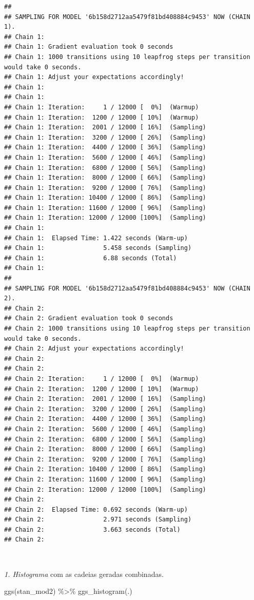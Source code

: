 \documentclass[
]{book}
\newenvironment{Shaded}{\begin{snugshade}}{\end{snugshade}}
\newcommand{\FunctionTok}[1]{\textcolor[rgb]{0.00,0.00,0.00}{#1}}
\newcommand{\NormalTok}[1]{#1}
\newcommand{\SpecialCharTok}[1]{\textcolor[rgb]{0.00,0.00,0.00}{#1}}
\begin{document}
\begin{verbatim}
## 
## SAMPLING FOR MODEL '6b158d2712aa5479f81bd408884c9453' NOW (CHAIN 1).
## Chain 1: 
## Chain 1: Gradient evaluation took 0 seconds
## Chain 1: 1000 transitions using 10 leapfrog steps per transition would take 0 seconds.
## Chain 1: Adjust your expectations accordingly!
## Chain 1: 
## Chain 1: 
## Chain 1: Iteration:     1 / 12000 [  0%]  (Warmup)
## Chain 1: Iteration:  1200 / 12000 [ 10%]  (Warmup)
## Chain 1: Iteration:  2001 / 12000 [ 16%]  (Sampling)
## Chain 1: Iteration:  3200 / 12000 [ 26%]  (Sampling)
## Chain 1: Iteration:  4400 / 12000 [ 36%]  (Sampling)
## Chain 1: Iteration:  5600 / 12000 [ 46%]  (Sampling)
## Chain 1: Iteration:  6800 / 12000 [ 56%]  (Sampling)
## Chain 1: Iteration:  8000 / 12000 [ 66%]  (Sampling)
## Chain 1: Iteration:  9200 / 12000 [ 76%]  (Sampling)
## Chain 1: Iteration: 10400 / 12000 [ 86%]  (Sampling)
## Chain 1: Iteration: 11600 / 12000 [ 96%]  (Sampling)
## Chain 1: Iteration: 12000 / 12000 [100%]  (Sampling)
## Chain 1: 
## Chain 1:  Elapsed Time: 1.422 seconds (Warm-up)
## Chain 1:                5.458 seconds (Sampling)
## Chain 1:                6.88 seconds (Total)
## Chain 1: 
## 
## SAMPLING FOR MODEL '6b158d2712aa5479f81bd408884c9453' NOW (CHAIN 2).
## Chain 2: 
## Chain 2: Gradient evaluation took 0 seconds
## Chain 2: 1000 transitions using 10 leapfrog steps per transition would take 0 seconds.
## Chain 2: Adjust your expectations accordingly!
## Chain 2: 
## Chain 2: 
## Chain 2: Iteration:     1 / 12000 [  0%]  (Warmup)
## Chain 2: Iteration:  1200 / 12000 [ 10%]  (Warmup)
## Chain 2: Iteration:  2001 / 12000 [ 16%]  (Sampling)
## Chain 2: Iteration:  3200 / 12000 [ 26%]  (Sampling)
## Chain 2: Iteration:  4400 / 12000 [ 36%]  (Sampling)
## Chain 2: Iteration:  5600 / 12000 [ 46%]  (Sampling)
## Chain 2: Iteration:  6800 / 12000 [ 56%]  (Sampling)
## Chain 2: Iteration:  8000 / 12000 [ 66%]  (Sampling)
## Chain 2: Iteration:  9200 / 12000 [ 76%]  (Sampling)
## Chain 2: Iteration: 10400 / 12000 [ 86%]  (Sampling)
## Chain 2: Iteration: 11600 / 12000 [ 96%]  (Sampling)
## Chain 2: Iteration: 12000 / 12000 [100%]  (Sampling)
## Chain 2: 
## Chain 2:  Elapsed Time: 0.692 seconds (Warm-up)
## Chain 2:                2.971 seconds (Sampling)
## Chain 2:                3.663 seconds (Total)
## Chain 2:
\end{verbatim}

\(~\)

\emph{1. Histograma} com as cadeias geradas combinadas.

\begin{Shaded}
\begin{Highlighting}[]
\FunctionTok{ggs}\NormalTok{(stan\_mod2) }\SpecialCharTok{\%\textgreater{}\%} \FunctionTok{ggs\_histogram}\NormalTok{(.)}
\end{Highlighting}
\end{Shaded}
\end{document}

